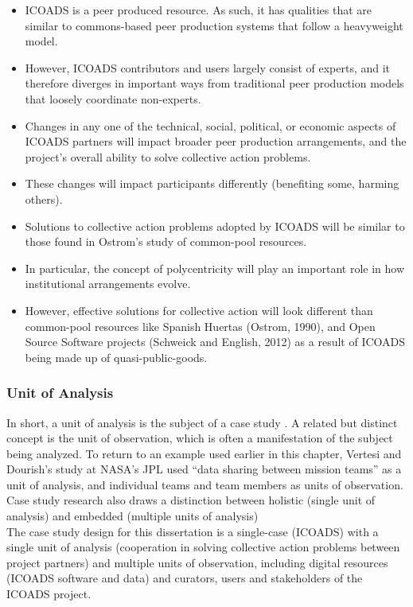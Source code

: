\documentclass[thesis,tocnosub,noragright,centerchapter,12pt]{uiucecethesis09}
\begin{document}
{\begin{itemize}
\itemsep1pt\parskip0pt
\item
  ICOADS is a peer produced resource. As such, it has qualities that are
  similar to commons-based peer production systems that follow a
  heavyweight model.
\item
  However, ICOADS contributors and users largely consist of experts, and it
  therefore diverges in important ways from traditional 
  peer production models that loosely coordinate non-experts.
\item
  Changes in any one of the technical, social, political, or economic
  aspects of ICOADS partners will impact broader peer production arrangements, and the project's overall
  ability to solve collective action problems.
\item
  These changes will impact participants differently (benefiting some,
  harming others).
\item
  Solutions to collective action problems adopted by ICOADS will be
  similar to those found in Ostrom's study of common-pool resources.
\item
  In particular, the concept of polycentricity will play an important
  role in how institutional arrangements evolve.
\item
  However, effective solutions for collective action will look different than common-pool
  resources like Spanish Huertas (Ostrom, 1990), and Open Source
  Software projects (Schweick and English, 2012) as a result of ICOADS
  being made up of quasi-public-goods.
\end{itemize}

\subsubsection*{Unit of Analysis}

In short, a unit of analysis is the subject of a case study \citep{Long2004}. A related but distinct concept is the unit of observation, which
is often a manifestation of the subject being analyzed. To return to an
example used earlier in this chapter, Vertesi and Dourish's study at
NASA's JPL used ``data sharing between mission teams'' as a unit of
analysis, and individual teams and team members as units of observation. Case study research also draws a distinction between holistic (single
unit of analysis) and embedded (multiple units of analysis) \citep[p. 40]{yin2003case}\\

The case study design for this dissertation is a single-case (ICOADS)
with a single unit of analysis (cooperation in solving collective action
problems between project partners) and multiple units of observation, including digital resources
(ICOADS software and data) and curators, users and stakeholders of the
ICOADS project.\\
}
\end{document}
